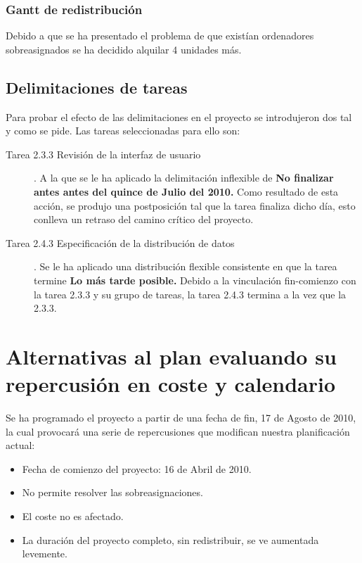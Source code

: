\documentclass[11pt,a4paper,spanish,twoside]{book}
\begin{document}
\subsection{Gantt de redistribución}
Debido a que se ha presentado el problema de que existían ordenadores
sobreasignados se ha decidido alquilar 4 unidades más. 

\section{Delimitaciones de tareas}
Para probar el efecto de las delimitaciones en el proyecto se introdujeron
dos tal y como se pide. Las tareas seleccionadas para ello son: 
\begin{description}
\item [Tarea 2.3.3 Revisión de la interfaz de usuario].
 A la que se le ha aplicado la delimitación inflexible de \textbf{No
   finalizar antes antes del quince de Julio del 2010.} Como resultado de esta acción, se
 produjo una postposición tal que la tarea finaliza dicho día, esto conlleva
 un retraso del camino crítico del proyecto.

\item [Tarea 2.4.3 Especificación de la distribución de datos].
 Se le ha aplicado una distribución flexible consistente en que la tarea
 termine \textbf{Lo más tarde posible.} Debido a la vinculación fin-comienzo
 con la tarea 2.3.3 y su grupo de tareas, la tarea 2.4.3 termina a la vez que
 la 2.3.3.
\end{description}
\chapter{Alternativas al plan evaluando su repercusión en 
coste y  calendario}

Se ha programado el proyecto a partir de una fecha de fin, 17 de Agosto de
2010, la cual provocará una serie de repercusiones que modifican nuestra
planificación actual: 
\begin{itemize}
\item Fecha de comienzo del proyecto: 16 de Abril de 2010.
\item No permite resolver las sobreasignaciones.
\item El coste no es afectado.
\item La duración del proyecto completo, sin redistribuir, se ve aumentada
  levemente.
\end{itemize}
\end{document}
